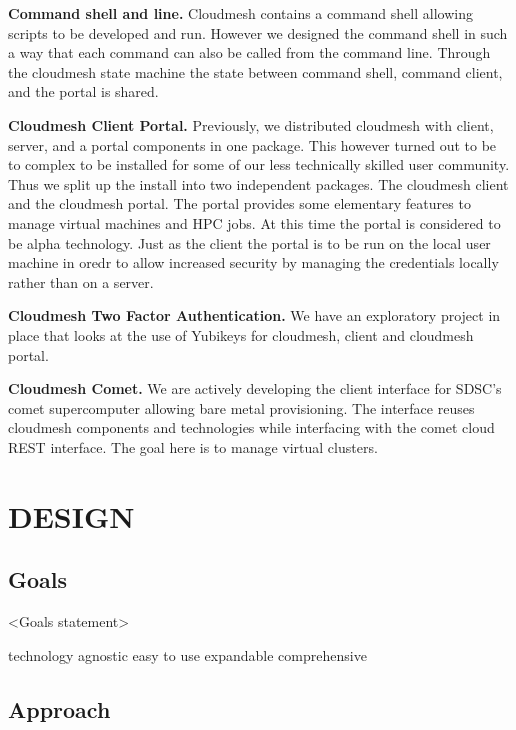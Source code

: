\begin{description}
\item{\bf Command shell and line.} Cloudmesh contains a command shell
allowing scripts to be developed and run. However we designed the
command shell in such a way that each command can also be called from
the command line. Through the cloudmesh state machine the state
between command shell, command client, and the portal is shared.

\item{\bf Cloudmesh Client Portal.} Previously, we distributed
cloudmesh with client, server, and a portal components in one
package. This however turned out to be to complex to be installed for
some of our less technically skilled user community. Thus we split up
the install into two independent packages. The cloudmesh client and
the cloudmesh portal. The portal provides some elementary features to
manage virtual machines and HPC jobs. At this time the portal is
considered to be alpha technology. Just as the client the portal is to
be run on the local user machine in oredr to allow increased security
by managing the credentials locally rather than on a server.

\item{\bf Cloudmesh Two Factor Authentication.} We have an
exploratory project in place that looks at the use of Yubikeys for
cloudmesh, client and cloudmesh portal.

\item{\bf Cloudmesh Comet.} We are actively developing the client
interface for SDSC’s comet supercomputer allowing bare metal
provisioning. The interface reuses cloudmesh components and
technologies while interfacing with the comet cloud REST
interface. The goal here is to manage virtual clusters.

\end{description}

\section{DESIGN}



\subsection{Goals}


<Goals statement> 

technology agnostic
easy to use
expandable
comprehensive


\subsection{Approach}



